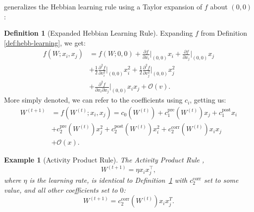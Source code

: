 \documentclass[nobib]{tufte-handout}
\newtheorem{example}{Example}
\theoremstyle{definition}
\newtheorem{definition}{Definition}
\begin{document}
\textcite{gerstner_mathematical_2002} generalizes the Hebbian learning
rule using a Taylor expansion of $f$ about $(0, 0)$:
\begin{definition}[Expanded Hebbian Learning Rule]\label{def:expanded-hebb}
Expanding $f$ from Definition \ref{def:hebb-learning}, we get:
\begin{align*}
f(W; x_i, x_j) &= f(W; 0, 0) + \frac{\partial f}{\partial x_i} \big|_{(0, 0)} x_i + \frac{\partial f}{\partial x_j} 
\big|_{(0, 0)} x_j \\
&+ \frac{1}{2} \frac{\partial^2 f}{\partial v^2_i} \big|_{(0, 0)} x_i^2 + \frac{1}{2} \frac{\partial^2 f}{\partial v^2_j}\big|_{(0, 0)} x_j^2 \\
&+ \frac{\partial^2 f}{\partial x_i \partial x_j}\big|_{(0, 0)} x_i x_j + \mathcal{O}(v).
\end{align*}
More simply denoted, we can refer to the coefficients using $c_i$, getting us:
\begin{align*}
W^{(t+1)} &= f(W^{(t)}; x_i, x_j) =
    c_0 (W^{(t)}) + c_1^\text{pre} (W^{(t)}) x_j + c_1^\text{post} x_i \\
    &+ c_2^\text{pre} (W^{(t)}) x_j^2 + c_2^\text{post} (W^{(t)}) x_i^2 + c_2^\text{corr} (W^{(t)}) x_i x_j \\
    &+ \mathcal{O} (x).
\end{align*}
\end{definition}

\begin{example}[Activity Product Rule]
    The \textit{Activity Product Rule} \parencite{haykin_neural_2009},
    $$
    W^{(t+1)} = \eta x_i x_j^\top,
    $$
    where $\eta$ is the \textit{learning rate},
    is identical to Definition~\ref{def:expanded-hebb} with $c_2^\text{corr}$
    set to some value, and all other coefficients set to $0$:
    $$
    W^{(t+1)} = c_2^\text{corr} (W^{(t)}) x_i x_j^T.
    $$
\end{example}

\printbibliography
\end{document}
